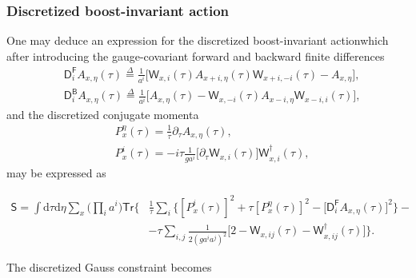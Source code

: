 \subsubsection*{Discretized boost-invariant action} 
One may deduce an expression for the discretized boost-invariant actionwhich after introducing the gauge-covariant forward and backward finite differences
\begin{align*}
&\textsf{D}_{i}^{\textsf{F}} A_{x, \eta}(\tau)\overset{\Delta}{=}\frac{1}{a^i}\big[\textsf{W}_{x, i}(\tau) A_{x+i, \eta}(\tau) \textsf{W}_{x+i,-i}(\tau)-A_{x, \eta}\big],\\
&\textsf{D}_{i}^{\textsf{B}} A_{x, \eta}(\tau) \overset{\Delta}{=}\frac{1}{a^i}\big[A_{x, \eta}(\tau)-\textsf{W}_{x,-i}(\tau) A_{x-i, \eta} \textsf{W}_{x-i, i}(\tau)\big],
\end{align*}
and the discretized conjugate momenta
\begin{align*}
&P_{x}^{\eta}(\tau)=\frac{1}{\tau} \partial_{\tau} A_{x, \eta}(\tau) ,\\
&P_{x}^{i}(\tau)=-i \tau\frac{1}{g a^{i}}\big[\partial_{\tau} \textsf{W}_{x, i}(\tau)\big] \textsf{W}_{x, i}^{\dagger}(\tau),
\end{align*}
may be expressed as
\begin{fullwidth}
\begin{align*}
\textsf{S}=\int \mathrm{d} \tau \mathrm{d} \eta \sum_{x}\Big(\prod_{i} a^{i}\Big) \textsf{Tr}\Bigg\{&\frac{1}{\tau} \sum_{i}\Big\{[P_{x}^{i}(\tau)]^{2}+\tau[P_{x}^{\eta}(\tau)]^{2}-[\textsf{D}_{i}^{\textsf{F}} A_{x, \eta}(\tau)\big]^{2}\Big\}- \\
&-\tau\sum_{i, j} \frac{1}{2\left(g a^{i} a^{j}\right)^{2}}\big[2-\textsf{W}_{x, i j}(\tau)-\textsf{W}_{x, i j}^{\dagger}(\tau)\big]\Bigg\}.
\end{align*}
\end{fullwidth}
The discretized Gauss constraint becomes
